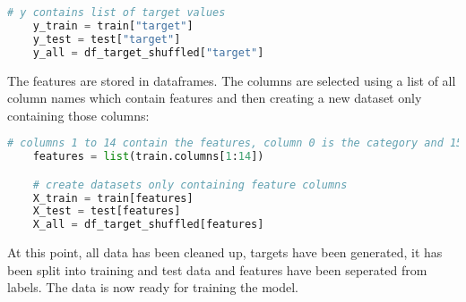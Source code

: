 \begin{lstlisting}[language=Python]
    # y contains list of target values
    y_train = train["target"]
    y_test = test["target"]
    y_all = df_target_shuffled["target"]
\end{lstlisting}

The features are stored in dataframes. The columns are selected using a list of all column names which contain features
and then creating a new dataset only containing those columns:

\begin{lstlisting}[language=Python]
    # columns 1 to 14 contain the features, column 0 is the category and 15 the target
    features = list(train.columns[1:14])

    # create datasets only containing feature columns
    X_train = train[features]
    X_test = test[features]
    X_all = df_target_shuffled[features]
\end{lstlisting}

At this point, all data has been cleaned up, targets have been generated, it has been split into training and test data and
features have been seperated from labels. The data is now ready for training the model.